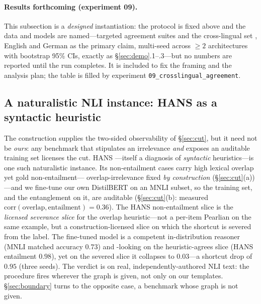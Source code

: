 \paragraph{Results forthcoming (experiment 09).} This subsection is a
\emph{designed} instantiation: the protocol is fixed above and the data and
models are named---targeted agreement suites \citep{marvin2018targeted} and the
cross-lingual set \citep{mueller2020crosslinguistic}, English and German as the
primary claim, multi-seed across $\geq 2$ architectures with bootstrap 95\% CIs,
exactly as \S\ref{sec:demo}.1--.3---but no numbers are reported until the run
completes. It is included to fix the framing and the analysis plan; the table is
filled by experiment \texttt{09\_crosslingual\_agreement}.

\subsection{A naturalistic NLI instance: HANS as a syntactic heuristic}\label{sec:hans}
The construction supplies the two-sided observability of \S\ref{sec:cut}, but it
need not be \emph{ours}: any benchmark that stipulates an irrelevance \emph{and}
exposes an auditable training set licenses the cut. HANS
\citep{mccoy2019right}---itself a diagnosis of \emph{syntactic} heuristics---is
one such naturalistic instance. Its
non-entailment cases carry high lexical overlap yet gold non-entailment---%
overlap-irrelevance fixed \emph{by construction} (\S\ref{sec:cut}(a))---and we
fine-tune our own DistilBERT on an MNLI subset, so the training set, and the
entanglement on it, are auditable (\S\ref{sec:cut}(b): measured
$\mathrm{corr}(\text{overlap},\text{entailment})=0.36$). The HANS
non-entailment slice is the \emph{licensed severance slice} for the
overlap heuristic---not a per-item Pearlian \doc{} on the same example,
but a construction-licensed slice on which the shortcut is severed from
the label. The fine-tuned
model is a competent in-distribution reasoner (MNLI matched accuracy $0.73$) and
\scg{}-looking on the heuristic-agrees slice (HANS entailment $0.98$), yet on the
severed slice it collapses to $0.03$---a shortcut drop of $\mathbf{0.95}$ (three
seeds). The verdict is \scs{} on real, independently-authored NLI text: the
procedure fires wherever the graph is given, not only on our templates.
\S\ref{sec:boundary} turns to the opposite case, a benchmark whose graph is
not given.

